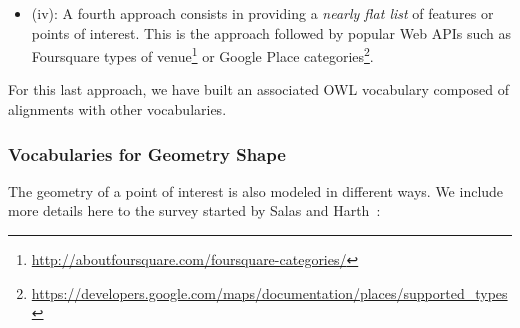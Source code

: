 \begin{itemize}
  \item (iv): A fourth approach consists in providing a \textit{nearly flat list} of features or points of interest. This is the approach followed by popular Web APIs such as Foursquare types of venue\footnote{\url{http://aboutfoursquare.com/foursquare-categories/}} or Google Place categories\footnote{\url{https://developers.google.com/maps/documentation/places/supported_types}}. 
\end{itemize}

For this last approach, we have built an associated OWL vocabulary composed of alignments with other vocabularies.

\subsubsection{Vocabularies for Geometry Shape}
The geometry of a point of interest is also modeled in different ways. We include more details here to the survey started by Salas and Harth~\cite{Salas2011}:
